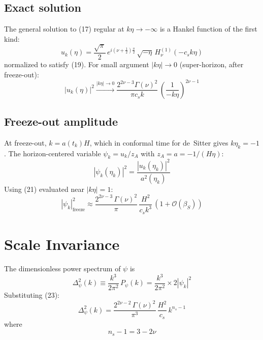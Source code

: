 \documentclass[12pt,a4paper]{article}
\begin{document}
\subsection{Exact solution}

The general solution to (17) regular at $k\eta \to -\infty$ is a Hankel function of the first kind:
\begin{equation}
u_k(\eta) = \frac{\sqrt{\pi}}{2}\,e^{i(\nu + \frac{1}{2})\frac{\pi}{2}}\,\sqrt{-\eta}\,H_\nu^{(1)}(-c_s k\eta) \tag{20}
\end{equation}
normalized to satisfy (19). For small argument $|k\eta| \to 0$ (super-horizon, after freeze-out):
\begin{equation}
|u_k(\eta)|^2 \xrightarrow{|k\eta| \to 0} \frac{2^{2\nu-3}\Gamma(\nu)^2}{\pi c_s k}\,\left(\frac{1}{-k\eta}\right)^{2\nu - 1} \tag{21}
\end{equation}

\subsection{Freeze-out amplitude}

At freeze-out, $k = a(t_k)H$, which in conformal time for de~Sitter gives $k\eta_k = -1$. The horizon-centered variable $\psi_k = u_k / z_A$ with $z_A = a = -1/(H\eta)$:
\begin{equation}
|\psi_k(\eta_k)|^2 = \frac{|u_k(\eta_k)|^2}{a^2(\eta_k)} \tag{22}
\end{equation}
Using (21) evaluated near $|k\eta| = 1$:
\begin{equation}
|\psi_k|_\text{freeze}^2 \approx \frac{2^{2\nu - 3}\,\Gamma(\nu)^2}{\pi}\,\frac{H^2}{c_s k^3}\,(1 + \mathcal{O}(\beta_S)) \tag{23}
\end{equation}

\section{Scale Invariance}

The dimensionless power spectrum of $\psi$ is
\begin{equation}
\Delta_\psi^2(k) \equiv \frac{k^3}{2\pi^2}\,P_\psi(k) = \frac{k^3}{2\pi^2} \times 2|\psi_k|^2 \tag{24}
\end{equation}
Substituting (23):
\begin{equation}
\Delta_\psi^2(k) = \frac{2^{2\nu-2}\,\Gamma(\nu)^2}{\pi^3}\,\frac{H^2}{c_s}\,k^{n_s - 1} \tag{25}
\end{equation}
where
\begin{equation}
n_s - 1 = 3 - 2\nu \tag{26}
\end{equation}
\end{document}
